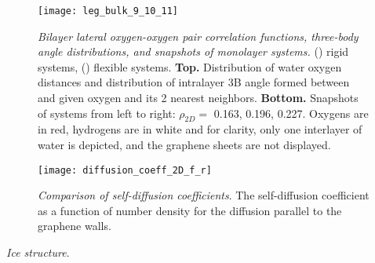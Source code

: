 \documentclass[12pt]{article}
\begin{document}
\begin{figure}[ht!]
	\centering
	\texttt{[image: leg\_bulk\_9\_10\_11]}\\
	\caption{\textit{Bilayer lateral oxygen-oxygen pair correlation functions, three-body angle distributions, and snapshots of monolayer systems.} (\protect{}) rigid systems, (\protect{}) flexible systems. \textbf{Top.} Distribution of water oxygen distances and distribution of intralayer 3B angle formed between and given oxygen and its 2 nearest neighbors. \textbf{Bottom.} Snapshots of systems from left to right: \(\rho_{2D}=\) 0.163, 0.196, 0.227. Oxygens are in red, hydrogens are in white and for clarity, only one interlayer of water is depicted, and the graphene sheets are not displayed.}
	\label{fig:struct_9_10_11}
\end{figure}

\begin{figure}[ht!]
	\centering
    \texttt{[image: diffusion\_coeff\_2D\_f\_r]}
	\caption{\textit{Comparison of self-diffusion coefficients}. The self-diffusion coefficient as a function of number density for the diffusion parallel to the graphene walls.}
	\label{fig:msd}
\end{figure}

\textit{Ice structure}.
\end{document}
